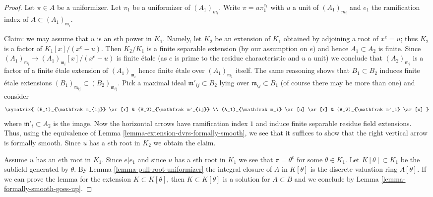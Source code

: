 \begin{proof}
Let $\pi \in A$ be a uniformizer. Let $\pi_1$ be a uniformizer
of $(A_1)_{m_i}$. Write $\pi = u \pi_1^{e_1}$ with $u$ a unit
of $(A_1)_{m_i}$ and $e_1$ the ramification index of
$A \subset (A_1)_{\mathfrak m_i}$.

\medskip\noindent
Claim: we may assume that $u$ is an $e$th power in $K_1$.
Namely, let $K_2$ be an extension of $K_1$ obtained by
adjoining a root of $x^e = u$; thus $K_2$ is a factor
of $K_1[x]/(x^e - u)$. Then $K_2/K_1$ is a finite
separable extension (by our assumption on $e$)
and hence $A_1 \subset A_2$ is finite.
Since $(A_1)_{\mathfrak m_i} \to (A_1)_{\mathfrak m_i}[x]/(x^e - u)$
is finite \'etale
(as $e$ is prime to the residue characteristic and $u$ a unit)
we conclude that $(A_2)_{\mathfrak m_i}$ is a factor of
a finite \'etale extension of $(A_1)_{\mathfrak m_i}$ hence
finite \'etale over $(A_1)_{\mathfrak m_1}$ itself.
The same reasoning shows that $B_1 \subset B_2$ induces
finite \'etale extensions
$(B_1)_{\mathfrak m_{ij}} \subset (B_2)_{\mathfrak m_{ij}}$.
Pick a maximal ideal $\mathfrak m'_{ij} \subset B_2$
lying over $\mathfrak m_{ij} \subset B_1$
(of course there may be more than one) and consider
$$
\xymatrix{
(B_1)_{\mathfrak m_{ij}} \ar[r] & (B_2)_{\mathfrak m'_{ij}} \\
(A_1)_{\mathfrak m_i} \ar[u] \ar[r] &
(A_2)_{\mathfrak m'_i} \ar[u]
}
$$
where $\mathfrak m'_i \subset A_2$ is the image.
Now the horizontal arrows have ramification index $1$
and induce finite separable residue field extensions.
Thus, using the equivalence of
Lemma \ref{lemma-extension-dvrs-formally-smooth},
we see that it suffices to show that the right vertical
arrow is formally smooth. Since $u$ has a $e$th root
in $K_2$ we obtain the claim.

\medskip\noindent
Assume $u$ has an $e$th root in $K_1$.
Since $e | e_1$ and since $u$ has a $e$th root in $K_1$
we see that $\pi = \theta^e$ for some $\theta \in K_1$.
Let $K[\theta] \subset K_1$ be the subfield generated by $\theta$.
By Lemma \ref{lemma-pull-root-uniformizer} the integral closure of
$A$ in $K[\theta]$ is the discrete valuation ring $A[\theta]$.
If we can prove the lemma for the extension $K \subset K[\theta]$,
then $K \subset K[\theta]$ is a solution for $A \subset B$ and
we conclude by
Lemma \ref{lemma-formally-smooth-goes-up}.


\end{proof}
